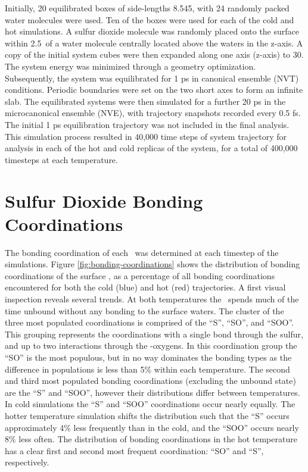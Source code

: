 \documentclass{article}
\begin{document}
Initially, 20 equilibrated boxes of side-lengths 8.545\angs, with 24 randomly packed water molecules were used. Ten of the boxes were used for each of the cold and hot simulations. A sulfur dioxide molecule was randomly placed onto the surface within 2.5\angs~of a water molecule centrally located above the waters in the z-axis. A copy of the initial system cubes were then expanded along one axis (z-axis) to 30\angs. The system energy was minimized through a geometry optimization. Subsequently, the system was equilibrated for 1 ps in canonical ensemble (NVT) conditions. Periodic boundaries were set on the two short axes to form an infinite slab. The equilibrated systems were then simulated for a further 20 ps in the microcanonical ensemble (NVE), with trajectory snapshots recorded every 0.5 fs. The initial 1 ps equilibration trajectory was not included in the final analysis. This simulation process resulted in 40,000 time steps of system trajectory for analysis in each of the hot and cold replicas of the system, for a total of 400,000 timesteps at each temperature.

\section {Sulfur Dioxide Bonding Coordinations}

The bonding coordination of each \suldiox~was determined at each timestep of the simulations. Figure \ref{fig:bonding-coordinations} shows the distribution of bonding coordinations of the surface \suldiox, as a percentage of all bonding coordinations encountered for both the cold (blue) and hot (red) trajectories. A first visual inspection reveals several trends. At both temperatures the \suldiox~spends much of the time unbound without any bonding to the surface waters. The cluster of the three most populated coordinations is comprised of the ``S'', ``SO'', and ``SOO''. This grouping represents the coordinations with a single bond through the sulfur, and up to two interactions through the \suldiox-oxygens. In this coordination group the ``SO'' is the most populous, but in no way dominates the bonding types as the difference in populations is less than 5\% within each temperature. The second and third most populated bonding coordinations (excluding the unbound state) are the ``S'' and ``SOO'', however their distributions differ between temperatures. In cold simulations the ``S'' and ``SOO'' coordinations occur nearly equally. The hotter temperature simulation shifts the distribution such that the ``S'' occurs approximately 4\% less frequently than in the cold, and the ``SOO'' occurs nearly 8\% less often. The distribution of bonding coordinations in the hot temperature has a clear first and second most frequent coordination: ``SO'' and ``S'', respectively. 
\end{document}
